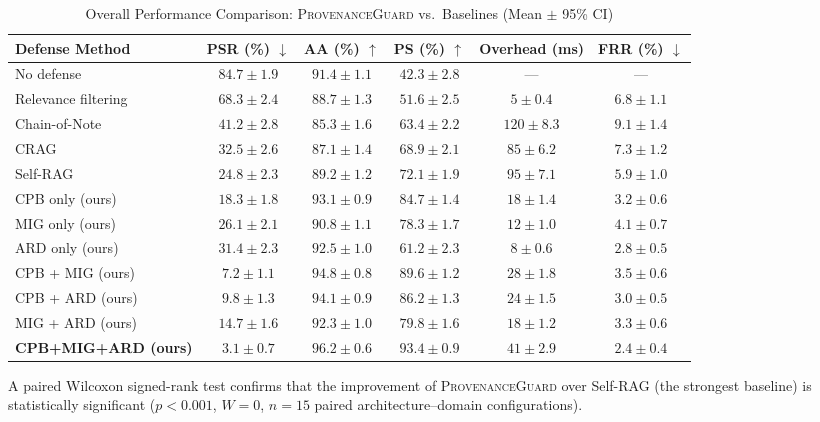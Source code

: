 \documentclass[journal,10pt]{IEEEtran}
\begin{document}
\begin{table}[t]
\centering
\caption{Overall Performance Comparison: \textsc{ProvenanceGuard} vs.\ Baselines (Mean $\pm$ 95\% CI)}
\label{tab:main_results}
\renewcommand{\arraystretch}{1.15}
\begin{tabular}{@{}l c c c c c@{}}
\toprule
\textbf{Defense Method} & \textbf{PSR (\%) $\downarrow$} & \textbf{AA (\%) $\uparrow$} & \textbf{PS (\%) $\uparrow$} & \textbf{Overhead (ms)} & \textbf{FRR (\%) $\downarrow$} \\
\midrule
No defense & $84.7 \pm 1.9$ & $91.4 \pm 1.1$ & $42.3 \pm 2.8$ & --- & --- \\
Relevance filtering & $68.3 \pm 2.4$ & $88.7 \pm 1.3$ & $51.6 \pm 2.5$ & $5 \pm 0.4$ & $6.8 \pm 1.1$ \\
Chain-of-Note~\cite{yu2023chainofnote} & $41.2 \pm 2.8$ & $85.3 \pm 1.6$ & $63.4 \pm 2.2$ & $120 \pm 8.3$ & $9.1 \pm 1.4$ \\
CRAG~\cite{yan2024corrective} & $32.5 \pm 2.6$ & $87.1 \pm 1.4$ & $68.9 \pm 2.1$ & $85 \pm 6.2$ & $7.3 \pm 1.2$ \\
Self-RAG~\cite{asai2024selfrag} & $24.8 \pm 2.3$ & $89.2 \pm 1.2$ & $72.1 \pm 1.9$ & $95 \pm 7.1$ & $5.9 \pm 1.0$ \\
\midrule
CPB only (ours) & $18.3 \pm 1.8$ & $93.1 \pm 0.9$ & $84.7 \pm 1.4$ & $18 \pm 1.4$ & $3.2 \pm 0.6$ \\
MIG only (ours) & $26.1 \pm 2.1$ & $90.8 \pm 1.1$ & $78.3 \pm 1.7$ & $12 \pm 1.0$ & $4.1 \pm 0.7$ \\
ARD only (ours) & $31.4 \pm 2.3$ & $92.5 \pm 1.0$ & $61.2 \pm 2.3$ & $8 \pm 0.6$ & $2.8 \pm 0.5$ \\
CPB + MIG (ours) & $7.2 \pm 1.1$ & $94.8 \pm 0.8$ & $89.6 \pm 1.2$ & $28 \pm 1.8$ & $3.5 \pm 0.6$ \\
CPB + ARD (ours) & $9.8 \pm 1.3$ & $94.1 \pm 0.9$ & $86.2 \pm 1.3$ & $24 \pm 1.5$ & $3.0 \pm 0.5$ \\
MIG + ARD (ours) & $14.7 \pm 1.6$ & $92.3 \pm 1.0$ & $79.8 \pm 1.6$ & $18 \pm 1.2$ & $3.3 \pm 0.6$ \\
\rowcolor{safegreen!8}
\textbf{CPB+MIG+ARD (ours)} & $\mathbf{3.1 \pm 0.7}$ & $\mathbf{96.2 \pm 0.6}$ & $\mathbf{93.4 \pm 0.9}$ & $41 \pm 2.9$ & $\mathbf{2.4 \pm 0.4}$ \\
\bottomrule
\end{tabular}
\end{table}

A paired Wilcoxon signed-rank test confirms that the improvement of \textsc{ProvenanceGuard} over Self-RAG (the strongest baseline) is statistically significant ($p < 0.001$, $W = 0$, $n = 15$ paired architecture--domain configurations).
\end{document}
